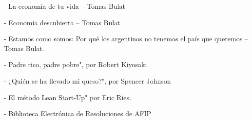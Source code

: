 {\fontsize{12}{15.5}\selectfont
\vspace{8pt}
- La economía de tu vida – Tomas Bulat

\vspace{8pt}
- Economía descubierta – Tomas Bulat

\vspace{8pt}
- Estamos como somos: Por qué los argentinos no tenemos el país que queremos –\\
Tomas Bulat.

\vspace{8pt}
- Padre rico, padre pobre", por Robert Kiyosaki

\vspace{14pt}
- ¿Quién se ha llevado mi queso?", por Spencer Johnson

\vspace{8pt}
- El método Lean Start-Up" por Eric Ries.

\vspace{8pt}
- Biblioteca Electrónica de Resoluciones de AFIP\par}

\endgroup
\clearpage
\restoregeometry
\pagestyle{fancy}
